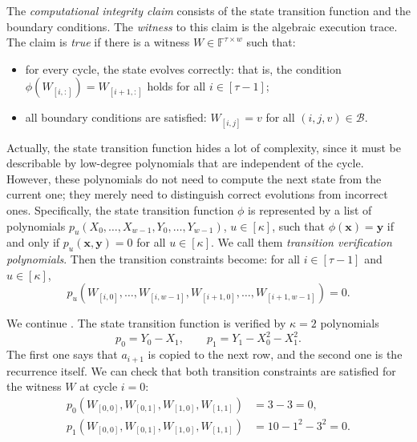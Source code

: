 \documentclass[../../book]{subfiles}
\begin{document}
The \emph{computational integrity claim} consists of the state transition function and the boundary conditions.
The \emph{witness} to this claim is the algebraic execution trace.
The claim is \emph{true} if there is a witness $W \in \mathbb{F}^{\tau \times w}$ such that:
\begin{itemize}
  \item for every cycle, the state evolves correctly: that is, the condition $\phi(W_{[i, :]}) = W_{[i+1, :]}$ holds for all $i \in [\tau - 1]$;
  \item all boundary conditions are satisfied: $W_{[i, j]} = v$ for all $(i, j, v) \in \mathcal{B}$.
\end{itemize}
Actually, the state transition function hides a lot of complexity, since it must be describable by low-degree polynomials that are independent of the cycle.
However, these polynomials do not need to compute the next state from the current one; they merely need to distinguish correct evolutions from incorrect ones.
Specifically, the state transition function $\phi$ is represented by a list of polynomials $p_u(X_0, \ldots, X_{w-1}, Y_0, \ldots, Y_{w-1})$, $u \in [\kappa]$, such that $\phi(\mathbf{x}) = \mathbf{y}$ if and only if $p_u(\mathbf{x}, \mathbf{y}) = 0$ for all $u \in [\kappa]$.
We call them \emph{transition verification polynomials}.
Then the transition constraints become: for all $i \in [\tau - 1]$ and $u \in [\kappa]$,
\begin{equation*}
  p_u(W_{[i, 0]}, \ldots, W_{[i, w-1]}, W_{[i+1, 0]}, \ldots, W_{[i+1, w-1]}) = 0.
\end{equation*}

\begin{example}\label{ex:stark-fibsq-2}
  We continue .
  The state transition function is verified by $\kappa = 2$ polynomials
  \begin{equation*}
    p_0 = Y_0 - X_1, \qquad p_1 = Y_1 - X_0^2 - X_1^2.
  \end{equation*}
  The first one says that $a_{i+1}$ is copied to the next row, and the second one is the recurrence itself.
  We can check that both transition constraints are satisfied for the witness $W$ at cycle $i = 0$:
  \begin{align*}
    p_0(W_{[0, 0]}, W_{[0, 1]}, W_{[1, 0]}, W_{[1, 1]}) &= 3 - 3 = 0, \\
    p_1(W_{[0, 0]}, W_{[0, 1]}, W_{[1, 0]}, W_{[1, 1]}) &= 10 - 1^2 - 3^2 = 0.
  \end{align*}
\end{example}
\end{document}
